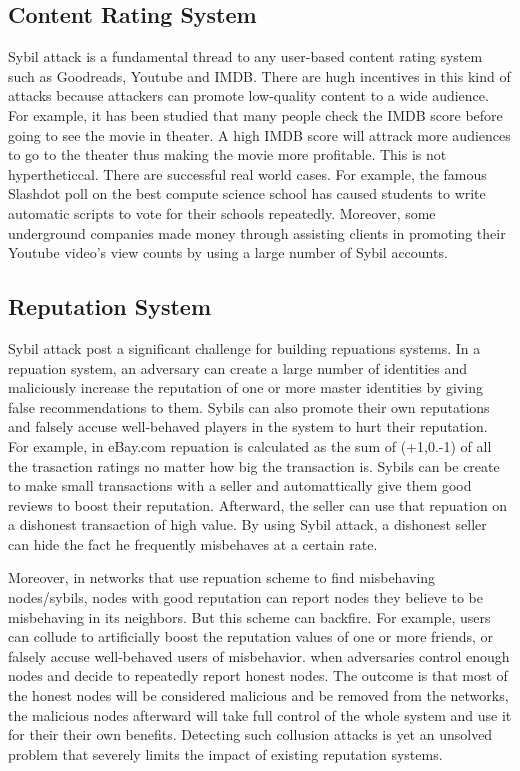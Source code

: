 \documentclass[conference]{IEEEtran}
\begin{document}
\subsection{Content Rating System}
Sybil attack is a fundamental thread to any user-based content rating system such as Goodreads, Youtube and IMDB. There are hugh incentives in this kind of attacks because attackers can promote low-quality content to a wide audience. For example, it has been studied that many people check the IMDB score before going to see the movie in theater. A high IMDB score will attrack more audiences to go to the theater thus making the movie more profitable. This is not hypertheticcal. There are successful real world cases. For example, the famous Slashdot poll on the best compute science school has caused students to write automatic scripts to vote for their schools repeatedly. Moreover, some underground companies made money through assisting clients in promoting their Youtube video's view counts by using a large number of Sybil accounts.\cite{Tran09SOC}

\subsection{Reputation System}
Sybil attack post a significant challenge for building repuations systems. In a repuation system, an adversary can create a large number of identities and maliciously increase the reputation of one or more master identities by giving false recommendations to them. Sybils can also promote their own reputations and falsely accuse well-behaved players in the system to hurt their reputation. For example, in eBay.com repuation is calculated as the sum of (+1,0.-1) of all the trasaction ratings no matter how big the transaction is. Sybils can be create to make small transactions with a seller and automattically give them good reviews to boost their reputation. Afterward, the seller can use that repuation on a dishonest transaction of high value. By using Sybil attack, a dishonest seller can hide the fact he frequently misbehaves at a certain rate.

Moreover, in networks that use repuation scheme to find misbehaving nodes/sybils, nodes with good reputation can report nodes they believe to be misbehaving in its neighbors. But this scheme can backfire.  For example, users can collude to artificially boost the reputation values of one or more friends, or falsely accuse well-behaved users of misbehavior. when adversaries control enough nodes and decide to repeatedly report honest nodes. The outcome is that most of the honest nodes will be considered malicious and be removed from the networks, the malicious nodes afterward will take full control of the whole system and use it for their their own benefits. Detecting such collusion attacks is yet an unsolved problem that severely limits the impact of existing reputation systems.\cite{Swamynathan10reputation}\cite{Lian07anempirical}
\end{document}
